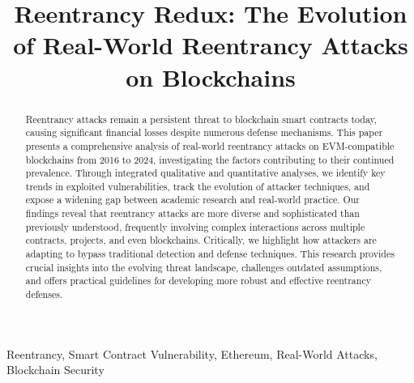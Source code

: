 \documentclass[conference]{IEEEtran}
\newcommand{\authornote}[3][Black]{
    \leavevmode\unskip\raisebox{-3.5pt}{\rlap{$\scriptstyle\diamond$}}%
    \marginpar{
        \raggedright\hbadness=10000
        \def\baselinestretch{0.8}\tiny
        \it \color{#1} #2: #3\par
    }
}
\newcommand{\rui}[1]{\authornote[Brown]{R}{#1}}
\begin{document}
\title{Reentrancy Redux: The Evolution of Real-World Reentrancy Attacks on Blockchains}

\author{
    \and
    \and
}

\maketitle

\begin{abstract}
Reentrancy attacks remain a persistent threat to blockchain smart contracts today, causing significant financial losses despite numerous defense mechanisms. This paper presents a comprehensive analysis of \ReentrancyTotalAnalyzed{} real-world reentrancy attacks on EVM-compatible blockchains from 2016 to 2024, investigating the factors contributing to their continued prevalence. Through integrated qualitative and quantitative analyses, we identify key trends in exploited vulnerabilities, track the evolution of attacker techniques, and expose a widening gap between academic research and real-world practice. Our findings reveal that reentrancy attacks are more diverse and sophisticated than previously understood, frequently involving complex interactions across multiple contracts, projects, and even blockchains. Critically, we highlight how attackers are adapting to bypass traditional detection and defense techniques. This research provides crucial insights into the evolving threat landscape, challenges outdated assumptions, and offers practical guidelines for developing more robust and effective reentrancy defenses.
\end{abstract}

\begin{IEEEkeywords}
Reentrancy, Smart Contract Vulnerability, Ethereum, Real-World Attacks, Blockchain Security
\end{IEEEkeywords}






















\end{document}
